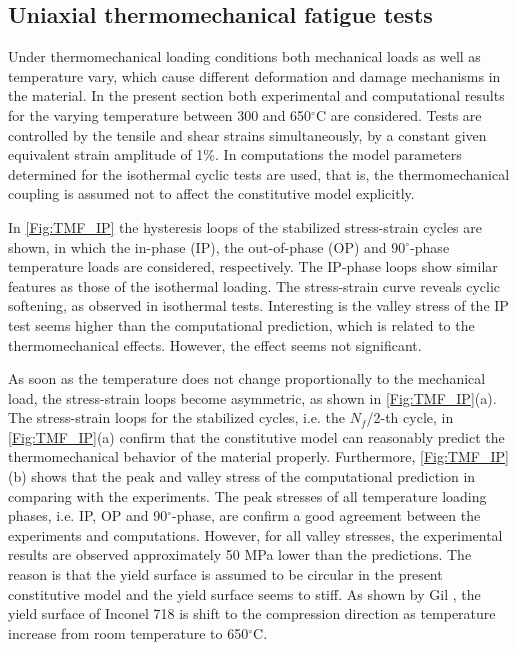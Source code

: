 \subsection{Uniaxial thermomechanical fatigue tests}
\noindent
Under thermomechanical loading conditions both mechanical loads as well as temperature vary, which cause different deformation and damage mechanisms in the material.
In the present section both experimental and computational results for the varying temperature between 300 and 650$^{\circ}$C are considered. Tests are controlled by the tensile and shear strains simultaneously, by a constant given equivalent strain amplitude of 1\%. In computations the model parameters determined for the isothermal cyclic tests are used, that is, the thermomechanical coupling is assumed not to affect the constitutive model explicitly.

In \ref{Fig:TMF_IP} the hysteresis loops of the stabilized stress-strain cycles are shown, in which the in-phase (IP), the out-of-phase (OP) and 90$^\circ$-phase temperature loads are considered, respectively.
The IP-phase loops show similar features as those of the isothermal loading.
The stress-strain curve reveals cyclic softening, as observed in isothermal tests. Interesting is the valley stress of the IP test seems higher than the computational prediction, which is related to the thermomechanical effects. However, the effect seems not significant.

As soon as the temperature does not change proportionally to the mechanical load, the stress-strain loops become asymmetric, as shown in \ref{Fig:TMF_IP}(a).
The stress-strain loops for the stabilized cycles, i.e. the $N_f$/2-th cycle, in \ref{Fig:TMF_IP}(a) confirm that the constitutive model can reasonably predict the thermomechanical behavior of the material properly.
Furthermore, \ref{Fig:TMF_IP}(b) shows that the peak and valley stress of the computational prediction in comparing with the experiments.
The peak stresses of all temperature loading phases, i.e. IP, OP and 90$^\circ$-phase, are confirm a good agreement between the experiments and computations.
However, for all valley stresses, the experimental results are observed approximately 50 MPa lower than the predictions.
The reason is that the yield surface is assumed to be circular in the present constitutive model and the yield surface seems to stiff.
As shown by Gil \cite{Gil1998}, the yield surface of Inconel 718 is shift to the compression direction as temperature increase from room temperature to 650$^{\circ}$C.

